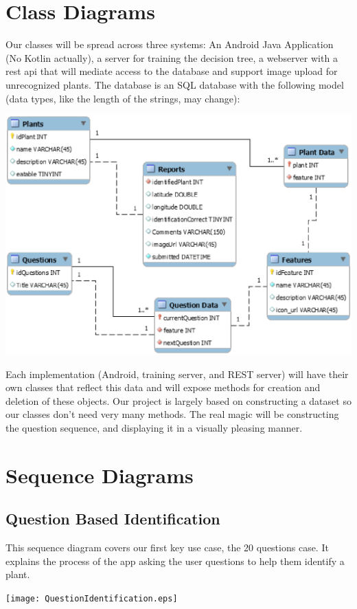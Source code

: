 \documentclass[a4paper]{article}
\begin{document}
\section{Class Diagrams}
Our classes will be spread across three systems: An Android Java Application (No Kotlin actually), a server for training the decision tree, a webserver with a rest api that will mediate access to the database and support image upload for unrecognized plants.  The database is an SQL database with the following model (data types, like the length of the strings, may change):
\begin{center}\includegraphics[scale=.6]{DatabaseDesign.eps}\end{center}
Each implementation (Android, training server, and REST server) will have their own classes that reflect this data and will expose methods for creation and deletion of these objects.  Our project is largely based on constructing a dataset so our classes don't need very many methods.  The real magic will be constructing the question sequence, and displaying it in a visually pleasing manner.
\pagebreak
\section{Sequence Diagrams}
\subsection{Question Based Identification}
This sequence diagram covers our first key use case, the 20 questions case. It explains the process of the app asking the user questions to help them identify a plant.
\begin{center}\texttt{[image: QuestionIdentification.eps]}\end{center}
\pagebreak
\end{document}
